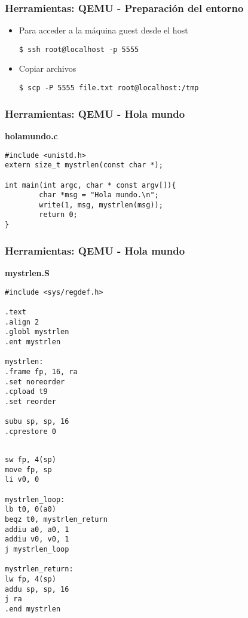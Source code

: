 \documentclass{beamer}
\begin{document}
\begin{frame}[fragile]
 \frametitle{Herramientas: QEMU - Preparación del entorno} 
 \begin{itemize}
\item Para acceder a la máquina guest desde el host
\begin{lstlisting}
$ ssh root@localhost -p 5555
\end{lstlisting}

\item Copiar archivos
\begin{lstlisting}
$ scp -P 5555 file.txt root@localhost:/tmp
\end{lstlisting}

\end{itemize}
  \end{frame}

  
  \begin{frame}[fragile]
 \frametitle{Herramientas: QEMU - Hola mundo} 
\textbf{holamundo.c}
\begin{lstlisting}
#include <unistd.h>
extern size_t mystrlen(const char *);

int main(int argc, char * const argv[]){
        char *msg = "Hola mundo.\n";
        write(1, msg, mystrlen(msg));
        return 0;
}

\end{lstlisting}
\end{frame}


  \begin{frame}[fragile]
 \frametitle{Herramientas: QEMU - Hola mundo}
 \textbf{mystrlen.S}

\begin{multicols}{2}
\begin{lstlisting}
#include <sys/regdef.h>

.text
.align 2
.globl mystrlen
.ent mystrlen

mystrlen:
.frame fp, 16, ra
.set noreorder
.cpload t9
.set reorder

subu sp, sp, 16
.cprestore 0


\end{lstlisting}

\columnbreak
\begin{lstlisting}
sw fp, 4(sp)
move fp, sp
li v0, 0

mystrlen_loop:
lb t0, 0(a0)
beqz t0, mystrlen_return
addiu a0, a0, 1
addiu v0, v0, 1
j mystrlen_loop

mystrlen_return:
lw fp, 4(sp)
addu sp, sp, 16
j ra
.end mystrlen
\end{lstlisting}
\end{multicols}
\end{frame}
\end{document}
